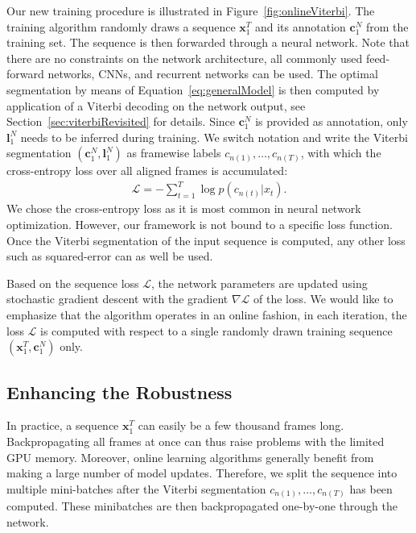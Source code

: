 \documentclass[10pt,twocolumn,letterpaper]{article}
\begin{document}
Our new training procedure is illustrated in Figure~\ref{fig:onlineViterbi}.
The training algorithm randomly draws a sequence $ \mathbf{x}_1^T $
and its annotation $ \mathbf{c}_1^N $ from the training set. The sequence is then
forwarded through a neural network. Note that there are no constraints on the network
architecture, all commonly used feed-forward networks, CNNs, and recurrent networks
can be used.
The optimal segmentation by means of Equation~\eqref{eq:generalModel} is then
computed by application of a Viterbi decoding on the network output, see Section~\ref{sec:viterbiRevisited}
for details. Since $ \mathbf{c}_1^N $ is provided as annotation, only $ \mathbf{l}_1^N $ needs
to be inferred during training.
We switch notation and write the Viterbi segmentation $ (\mathbf{c}_1^N, \mathbf{l}_1^N) $
as framewise labels $ c_{n(1)}, \dots, c_{n(T)} $, with which the cross-entropy loss over all aligned frames
is accumulated:
\begin{align}
    \mathcal{L} = -\sum_{t=1}^T \log p(c_{n(t)}|x_t).
\end{align}
We chose the cross-entropy loss as it is most common in neural network
optimization. However, our framework is not bound to a specific loss function.
Once the Viterbi segmentation of the input sequence is computed, any other
loss such as squared-error can as well be used.

Based on the sequence loss $ \mathcal{L} $, the network parameters are updated
using stochastic gradient descent with the gradient $ \nabla \mathcal{L} $ of the
loss. We would like to emphasize that the algorithm operates in an online fashion,
\ie in each iteration, the loss $ \mathcal{L} $ is computed with respect to a single
randomly drawn training sequence $ (\mathbf{x}_1^T, \mathbf{c}_1^N) $ only.


\subsection{Enhancing the Robustness}
\label{sec:robust}

In practice, a sequence $ \mathbf{x}_1^T $ can easily be a few thousand frames long.
Backpropagating all frames at once can thus raise problems with the limited GPU memory.
Moreover, online learning algorithms generally benefit from making a large number of model
updates. Therefore, we split the sequence into multiple mini-batches after the Viterbi segmentation
$ c_{n(1)},\dots,c_{n(T)} $ has been computed. These minibatches are then backpropagated
one-by-one through the network.
\end{document}
